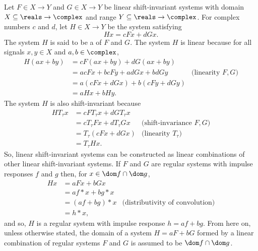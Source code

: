 Let $F \in X \to Y$ and $G \in X \to Y$ be linear shift-invariant systems with domain $X \subseteq \reals \to \complex$ and range $Y \subseteq \reals \to \complex$.  For complex numbers $c$ and $d$, let $H \in X \to Y$ be the system satisfying
\[
Hx = cFx + dGx.
\]
The system $H$ is said to be a  of $F$ and $G$.  The system $H$ is linear because for all signals $x,y \in X$ and $a,b \in \complex$,
\begin{align*}
H(ax + by) &= cF(ax+by) + dG(ax+by) \\
&= acF x +bcFy + adGx+ bdGy & \text{(linearity $F, G$)} \\
&= a ( cFx  + dGx ) + b ( cFy + dGy ) \\
&= aHx + bHy.
\end{align*}
The system $H$ is also shift-invariant because
\begin{align*}
HT_\tau x &= cFT_\tau x + dGT_\tau x  \\
&= c T_\tau F x + dT_\tau G x & \text{(shift-invariance $F,G$)} \\
&= T_\tau( cF x + dG x ) & \text{(linearity $T_\tau$)} \\
&= T_\tau H x.
\end{align*}
So, linear shift-invariant systems can be constructed as linear combinations of other linear shift-invariant systems.  If $F$ and $G$ are regular systems with impulse responses $f$ and $g$ then, for $x \in \dom f \cap \dom g$,
\begin{align*}
Hx &= a F x + b G x \\
&= a f * x + b g * x \\
&= (a f + bg) * x &\text{(distributivity of convolution)}\\
&= h * x,
\end{align*}
and so, $H$ is a regular system with impulse response $h = af + bg$.  From here on, unless otherwise stated, the domain of a system $H = aF + bG$ formed by a linear combination of regular systems $F$ and $G$ is assumed to be $\dom f \cap \dom g$.  %

